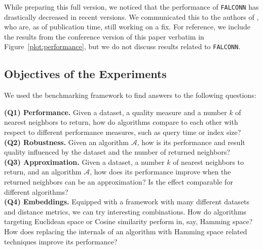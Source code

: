 \medskip 

 While preparing this full version, we noticed that the performance of \texttt{FALCONN} has drastically decreased in recent versions. We communicated this to the authors of \cite{falconn}, who are, as of publication time, still working on a fix. For reference, we include the results from the conference version of this paper verbatim in Figure~\ref{plot:performance}, but we do not discuss results related to \texttt{FALCONN}.

\subsection{Objectives of the Experiments}
We used the benchmarking framework to find answers to the following questions:

\noindent\textbf{(Q1) Performance.} Given a dataset, a quality measure and a number $k$ of nearest neighbors to return, how do algorithms compare to each other with respect 
        to different performance measures, such as query time or index size?\\
\noindent\textbf{(Q2) Robustness.} Given an algorithm $\mathcal{A}$, how is its performance 
        and result quality influenced by the dataset and the number of returned neighbors?\\
\noindent\textbf{(Q3) Approximation.} Given a dataset, a number $k$ of nearest neighbors to return, 
        and an algorithm $\mathcal{A}$, how does its performance improve when the returned neighbors can be an approximation? Is the effect comparable for different algorithms? \\
\noindent\textbf{(Q4) Embeddings.} Equipped with a framework with many different datasets and distance metrics, we can try interesting combinations. How do algorithms targeting Euclidean space or Cosine similarity perform in, say, Hamming space? How does replacing the internals of an algorithm with Hamming space related techniques improve its performance?

\begin{figure}[t!]

\end{figure}

